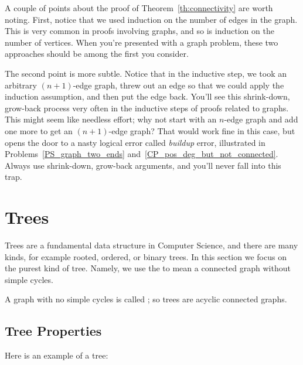 A couple of points about the proof of Theorem~\ref{th:connectivity} are
worth noting.  First, notice that we used induction on the number of edges
in the graph.  This is very common in proofs involving graphs, and so is
induction on the number of vertices.  When you're presented with a graph
problem, these two approaches should be among the first you consider.

The second point is more subtle.  Notice that in the inductive step, we
took an arbitrary $(n+1)$-edge graph, threw out an edge so that we could
apply the induction assumption, and then put the edge back.  You'll see
this shrink-down, grow-back process very often in the inductive steps of
proofs related to graphs.  This might seem like needless effort; why not
start with an $n$-edge graph and add one more to get an $(n+1)$-edge
graph?  That would work fine in this case, but opens the door to a nasty
logical error called \emph{buildup} error, illustrated in
Problems~\ref{PS_graph_two_ends} and~\ref{CP_pos_deg_but_not_connected}.
Always use shrink-down, grow-back arguments, and you'll never fall into
this trap.



\begin{problems}
\classproblems
{}
\homeworkproblems
{}
\end{problems}

\section{Trees}\label{trees-sec}

Trees are a fundamental data structure in Computer Science, and there are
many kinds, for example rooted, ordered, or binary trees.  In this section
we focus on the purest kind of tree.  Namely, we use the  to
mean a connected graph without simple cycles.

A graph with no simple cycles is called ; so trees are
acyclic connected graphs.

\subsection{Tree Properties}
Here is an example of a tree:

